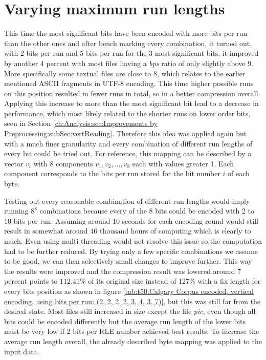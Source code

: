\section{Varying maximum run lengths}
\label{ch:Conceptual Design:sec:var lengths}
\par{
This time the most significant bits have been encoded with more bits per run than the other ones and after bench marking every combination, it turned out, with 2 bits per run and 5 bits per run for the 3 most significant bits, it improved by another 4 percent with most files having a \textit{bps} ratio of only slightly above 9. More specifically some textual files are close to 8, which relates to the earlier mentioned ASCII fragments in UTF-8 encoding. This time higher possible runs on this position resulted in fewer runs in total, so in a better compression overall. Applying this increase to more than the most significant bit lead to a decrease in performance, which most likely related to the shorter runs on lower order bits, seen in Section \ref{ch:Analysis:sec:Improvements by Preprocessing:subSec:vertReading}. Therefore this idea was applied again but with a much finer granularity and every combination of different run lengths of every bit could be tried out. For reference, this mapping can be described by a vector $v_i$ with 8 components $v_1,v_2,...,v_8$ each with values greater 1. Each component corresponds to the bits per run stored for the bit number $i$ of each byte.
}
\par{
Testing out every reasonable combination of different run lengths would imply running $8^8$ combinations because every of the 8 bits could be encoded with 2 to 10 bits per run. Assuming around 10 seconds for each encoding round would still result in somewhat around 46 thousand hours of computing which is clearly to much. Even using multi-threading would not resolve this issue so the computation had to be further reduced. By trying only a few specific combinations we assume to be good, we can then selectively small changes to improve further. This way the results were improved and the compression result was lowered around 7 percent points to $112.41\%$ of its original size instead of 127\% with a fix length for every bits position as shown in figure \ref{tab:t50:Calgary Corpus encoded, vertical encoding, using bits per run: (2, 2, 2, 2, 3, 4, 3, 7)}, but this was still far from the desired state. Most files still increased in size except the file \textit{pic}, even though all bits could be encoded differently but the average run length of the lower bits must be very low if 2 bits per RLE number achieved best results. To increase the average run length overall, the already described byte mapping was applied to the input data.
}
